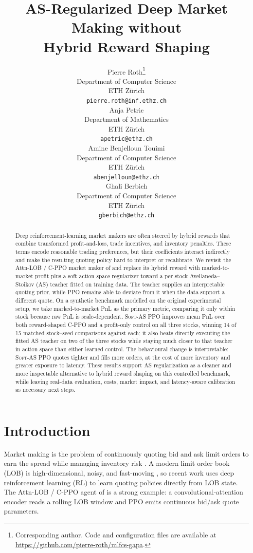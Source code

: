 \documentclass{article}
\title{AS-Regularized Deep Market Making without\\ Hybrid Reward Shaping}
\author{%
  Pierre Roth\thanks{Corresponding author. Code and configuration files are available at \url{https://github.com/pierre-roth/mlfcs-gapa}.} \\
  Department of Computer Science\\
  ETH Z\"urich\\
  \texttt{pierre.roth@inf.ethz.ch} \\
  \And
  Anja Petric \\
  Department of Mathematics\\
  ETH Z\"urich \\
  \texttt{apetric@ethz.ch} \\
  \AND
  Amine Benjelloun Touimi \\
  Department of Computer Science\\
  ETH Z\"urich \\
  \texttt{abenjelloun@ethz.ch} \\
  \And
  Ghali Berbich \\
  Department of Computer Science\\
  ETH Z\"urich \\
  \texttt{gberbich@ethz.ch} \\
}
\newcommand{\softas}{\textsc{Soft-AS PPO}}
\newcommand{\cppo}{\textsc{C-PPO}}
\begin{document}
\maketitle

\begin{abstract}
Deep reinforcement-learning market makers are often steered by hybrid rewards that combine transformed profit-and-loss, trade incentives, and inventory penalties. These terms encode reasonable trading preferences, but their coefficients interact indirectly and make the resulting quoting policy hard to interpret or recalibrate. We revisit the Attn-LOB / C-PPO market maker of \citet{guo2023mm} and replace its hybrid reward with marked-to-market profit plus a soft action-space regularizer toward a per-stock Avellaneda--Stoikov (AS) teacher fitted on training data. The teacher supplies an interpretable quoting prior, while PPO remains able to deviate from it when the data support a different quote. On a synthetic benchmark modelled on the original experimental setup, we take marked-to-market PnL as the primary metric, comparing it only within stock because raw PnL is scale-dependent. \softas{} improves mean PnL over both reward-shaped \cppo{} and a profit-only control on all three stocks, winning 14 of 15 matched stock--seed comparisons against each; it also beats directly executing the fitted AS teacher on two of the three stocks while staying much closer to that teacher in action space than either learned control. The behavioural change is interpretable: \softas{} quotes tighter and fills more orders, at the cost of more inventory and greater exposure to latency. These results support AS regularization as a cleaner and more inspectable alternative to hybrid reward shaping on this controlled benchmark, while leaving real-data evaluation, costs, market impact, and latency-aware calibration as necessary next steps.
\end{abstract}

\section{Introduction}

Market making is the problem of continuously quoting bid and ask limit orders to earn the spread while managing inventory risk \citep{ho1981,stoll1989,odhara1998}. A modern limit order book (LOB) is high-dimensional, noisy, and fast-moving \citep{gould2013}, so recent work uses deep reinforcement learning (RL) to learn quoting policies directly from LOB state. The Attn-LOB / C-PPO agent of \citet{guo2023mm} is a strong example: a convolutional-attention encoder reads a rolling LOB window and PPO emits continuous bid/ask quote parameters.
\end{document}
